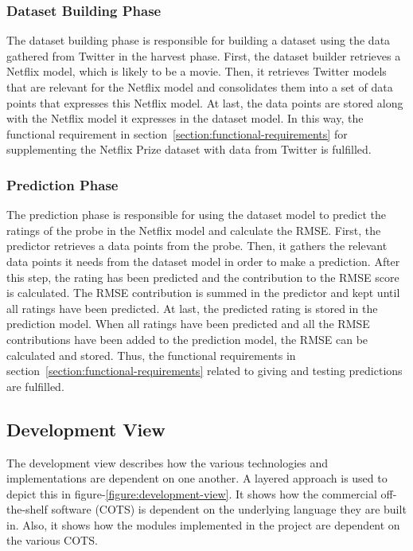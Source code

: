 \subsubsection{Dataset Building Phase}
The dataset building phase is responsible for building a dataset using the data gathered from Twitter in the harvest phase. First, the dataset builder retrieves a Netflix model, which is likely to be a movie. Then, it retrieves Twitter models that are relevant for the Netflix model and consolidates them into a set of data points that expresses this Netflix model. At last, the data points are stored along with the Netflix model it expresses in the dataset model. In this way, the functional requirement in section~\ref{section:functional-requirements} for supplementing the Netflix Prize dataset with data from Twitter is fulfilled.

\subsubsection{Prediction Phase}\label{subsubsec:predict-phase}
The prediction phase is responsible for using the dataset model to predict the ratings of the probe in the Netflix model and calculate the RMSE. First, the predictor retrieves a data points from the probe. Then, it gathers the relevant data points it needs from the dataset model in order to make a prediction. After this step, the rating has been predicted and the contribution to the RMSE score is calculated. The RMSE contribution is summed in the predictor and kept until all ratings have been predicted. At last, the predicted rating is stored in the prediction model. When all ratings have been predicted and all the RMSE contributions have been added to the prediction model, the RMSE can be calculated and stored. Thus, the functional requirements in section~\ref{section:functional-requirements} related to giving and testing predictions are fulfilled.

\subsection{Development View}
The development view describes how the various technologies and implementations are dependent on one another. A layered approach is used to depict this in figure-\ref{figure:development-view}. It shows how the commercial off-the-shelf software (COTS) is dependent on the underlying language they are built in. Also, it shows how the modules implemented in the project are dependent on the various COTS.

